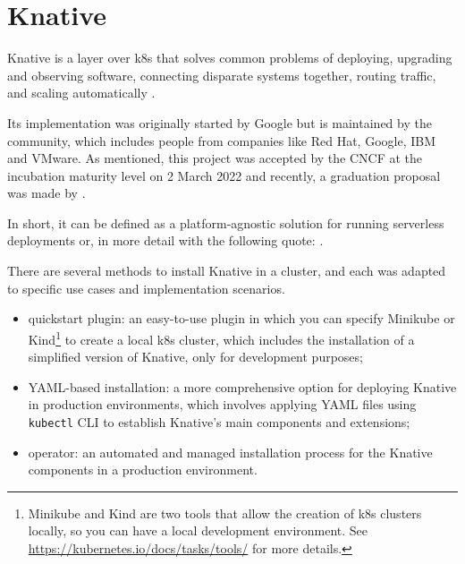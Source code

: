 \documentclass[../thesis.tex]{subfiles}
\begin{document}
\section{Knative}\label{sec:knative}
Knative is a layer over \gls{k8s} that solves common problems of deploying, upgrading and observing software, connecting disparate systems together, routing traffic, and scaling automatically \cite{site:knative}.

Its implementation was originally started by Google but is maintained by the community, which includes people from companies like Red Hat, Google, IBM and VMware. As mentioned, this project was accepted by the \acrshort{CNCF} at the incubation maturity level on 2 March 2022 and recently, a graduation proposal was made by \citeauthor{site:knative_graduation} \cite{site:knative_graduation}.

In short, it can be defined as a platform-agnostic solution for running serverless deployments or, in more detail with the following quote:
 \cite{site:knative_cncf_project}.

There are several methods to install Knative in a cluster, and each was adapted to specific use cases and implementation scenarios.

\begin{itemize}
    \item quickstart plugin: an easy-to-use plugin in which you can specify Minikube or Kind\footnote{Minikube and Kind are two tools that allow the creation of \gls{k8s} clusters locally, so you can have a local development environment. See \href{https://kubernetes.io/docs/tasks/tools/}{https://kubernetes.io/docs/tasks/tools/} for more details.} to create a local \gls{k8s} cluster, which includes the installation of a simplified version of Knative, only for development purposes;
    \item \acrshort{YAML}-based installation: a more comprehensive option for deploying Knative in production environments, which involves applying \acrshort{YAML} files using 
\texttt{kubectl} \acrshort{CLI} to establish Knative's main components and extensions;
    \item operator: an automated and managed installation process for the Knative components in a production environment.
\end{itemize}
\end{document}
